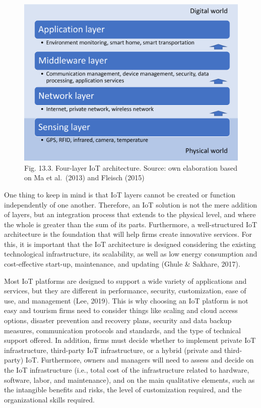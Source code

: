 \documentclass[
  letterpaper,
  DIV=11,
  numbers=noendperiod]{scrreprt}
\begin{document}
\begin{figure}

{\centering \includegraphics[width=6.25in,height=\textheight]{img/fig18.png}

}

\caption{Fig. 13.3. Four-layer IoT architecture. Source: own elaboration
based on Ma et al.~(2013) and Fleisch (2015)}

\end{figure}

One thing to keep in mind is that IoT layers cannot be created or
function independently of one another. Therefore, an IoT solution is not
the mere addition of layers, but an integration process that extends to
the physical level, and where the whole is greater than the sum of its
parts. Furthermore, a well-structured IoT architecture is the foundation
that will help firms create innovative services. For this, it is
important that the IoT architecture is designed considering the existing
technological infrastructure, its scalability, as well as low energy
consumption and cost-effective start-up, maintenance, and updating
(Ghule \& Sakhare, 2017).

Most IoT platforms are designed to support a wide variety of
applications and services, but they are different in performance,
security, customization, ease of use, and management (Lee, 2019). This
is why choosing an IoT platform is not easy and tourism firms need to
consider things like scaling and cloud access options, disaster
prevention and recovery plans, security and data backup measures,
communication protocols and standards, and the type of technical support
offered. In addition, firms must decide whether to implement private IoT
infrastructure, third-party IoT infrastructure, or a hybrid (private and
third-party) IoT. Furthermore, owners and managers will need to assess
and decide on the IoT infrastructure (i.e., total cost of the
infrastructure related to hardware, software, labor, and maintenance),
and on the main qualitative elements, such as the intangible benefits
and risks, the level of customization required, and the organizational
skills required.
\end{document}
